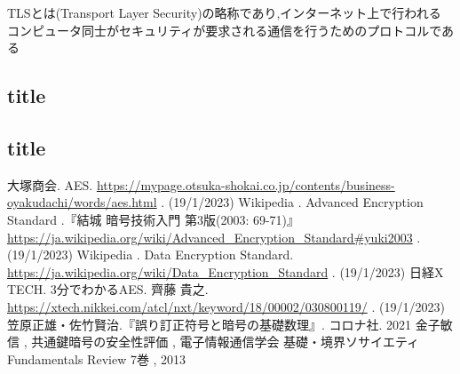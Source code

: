 \documentclass[dvipdfmx,autodetect-engine,titlepage]{jsarticle}
\begin{document}
TLSとは(Transport Layer Security)の略称であり,インターネット上で行われる
コンピュータ同士がセキュリティが要求される通信を行うためのプロトコルである

\subsection{title}

\subsection{title}

\begin{thebibliography}{99}
    大塚商会. AES. 
      \url{https://mypage.otsuka-shokai.co.jp/contents/business-oyakudachi/words/aes.html} . (19/1/2023)
    Wikipedia . Advanced Encryption Standard .『結城 暗号技術入門 第3版(2003: 69-71)』\\
      \url{https://ja.wikipedia.org/wiki/Advanced_Encryption_Standard#yuki2003} . (19/1/2023)
    Wikipedia . Data Encryption Standard.\\
      \url{https://ja.wikipedia.org/wiki/Data_Encryption_Standard} . (19/1/2023)
    日経X TECH. 3分でわかるAES. 齊藤 貴之. \\
      \url{https://xtech.nikkei.com/atcl/nxt/keyword/18/00002/030800119/} . (19/1/2023)
    笠原正雄・佐竹賢治.『誤り訂正符号と暗号の基礎数理』. コロナ社. 2021
    金子敏信 , 共通鍵暗号の安全性評価 , 電子情報通信学会 基礎・境界ソサイエティ Fundamentals Review 7巻 , 2013

\end{thebibliography}
\end{document}
